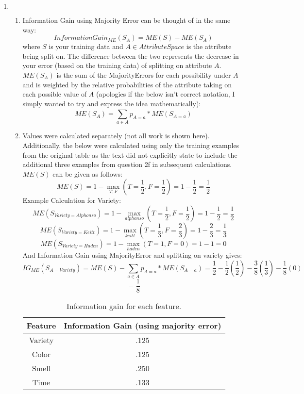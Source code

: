 \documentclass[11pt,a4paper,draft]{article}
\begin{document}
\begin{enumerate}
		\item $ $
		\begin{enumerate}
			\item Information Gain using Majority Error can be thought of in the same way:
			$$InformationGain_{ME}(S_{A}) = ME(S) - ME(S_A)$$ where $S$ is your training data and $A \in Attribute Space$ is the attribute being split on. The difference between the two represents the decrease in your error (based on the training data) of splitting on attribute $A$. $ME(S_A)$ is the sum of the MajorityErrors for each possibility under $A$ and is weighted by the relative probabilities of the attribute taking on each possible value of $A$ (apologies if the below isn't correct notation, I simply wanted to try and express the idea mathematically):
			\\
			$$ME(S_{A}) = \sum_{a \in A}^{}p_{A=a}*ME(S_{A=a})$$
			\item Values were calculated separately (not all work is shown here). Additionally, the below were calculated using only the training examples from the original table as the text did not explicitly state to include the additional three examples from question 2f in subsequent calculations. $ME(S)$ can be given as follows:
			$$ME(S) = 1 - \max\limits_{T,F}(T=\frac{1}{2},F=\frac{1}{2}) = 1 - \frac{1}{2}= \frac{1}{2}$$
			Example Calculation for Variety:
			$$ME(S_{Variety=Alphonso}) = 1 - \max\limits_{alphonso}(T=\frac{1}{2},F=\frac{1}{2}) = 1 - \frac{1}{2}= \frac{1}{2}$$
			$$ME(S_{Variety=Keitt}) = 1 - \max\limits_{keitt}(T=\frac{1}{3},F=\frac{2}{3}) = 1 - \frac{2}{3}= \frac{1}{3}$$
			$$ME(S_{Variety=Haden}) = 1 - \max\limits_{haden}(T=1,F=0) = 1 - 1= 0$$
			And Information Gain using MajorityError and splitting on variety gives:
			$$IG_{ME}(S_{A=Variety}) = ME(S) - \sum_{a \in A}p_{A=a}*ME(S_{A=a}) = \frac{1}{2} - \frac{1}{2}(\frac{1}{2}) - \frac{3}{8}(\frac{1}{3}) - \frac{1}{8}(0)$$ $$=\frac{1}{8}$$
				 \begin{table}[h!]
					\centering
					\begin{tabular}{c|c}
						\hline
						Feature & Information Gain (using majority error) \\ \hline
						Variety &       .125        \\
						Color   &       .125         \\
						Smell   &       .250          \\
						Time    &       .133           \\ \hline
					\end{tabular}
					\caption{Information gain for each feature.}\label{tb-maj-ig}
				\end{table}
			

\end{enumerate}
\end{enumerate}
\end{document}
